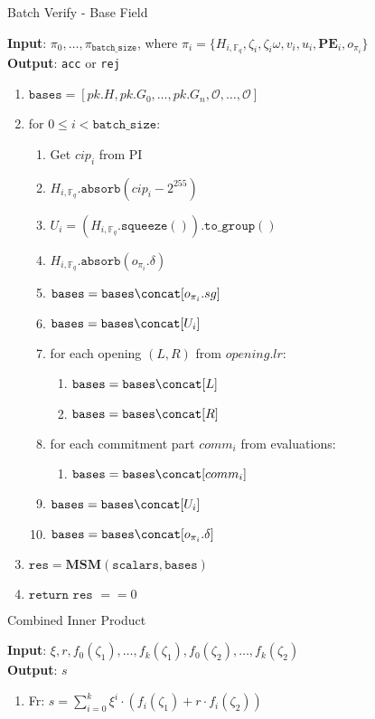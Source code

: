 \begin{algorithm}[H]
    \caption{Batch Verify - Base Field}
    \textbf{Input}: $\pi_0, \dots, \pi_{\texttt{batch\_size}}$, where $\pi_i = \{H_{i, \mathbb{F}_q}, \zeta_i, \zeta_i\omega, v_i, u_i,
    \textbf{PE}_i, o_{\pi_i} \}$ \\
    \textbf{Output}: \texttt{acc} or \texttt{rej}
    \begin{enumerate}
        \item $\texttt{bases} = [pk.H, pk.G_0, \dots, pk.G_n, \mathcal{O}, \dots, \mathcal{O}]$
        \item for $0 \leq i < \texttt{batch\_size}$:
        \begin{enumerate}
        	  \item Get $cip_i$ from PI
            \item $H_{i, \mathbb{F}_q}.\texttt{absorb}(cip_i - 2^{255})$
            \item $U_i = (H_{i, \mathbb{F}_q}.\texttt{squeeze}()).\texttt{to\_group}()$
            \item $H_{i, \mathbb{F}_q}.\texttt{absorb}(o_{\pi_i}.\delta)$
            \item $\texttt{bases} = \texttt{bases} \concat [o_{\pi_i}.sg]$
	   \item $\texttt{bases} = \texttt{bases} \concat [U_i]$
	   \item for each opening $(L, R)$ from $opening.lr$:
	   \begin{enumerate}
		\item $\texttt{bases} = \texttt{bases} \concat [L]$
		\item $\texttt{bases} = \texttt{bases} \concat [R]$
	   \end{enumerate}
	   \item for each commitment part $comm_i$ from evaluations:
            \begin{enumerate}
		\item $\texttt{bases} = \texttt{bases} \concat [comm_i]$
	   \end{enumerate}
            \item $\texttt{bases} = \texttt{bases} \concat [U_i]$
	   \item $\texttt{bases} = \texttt{bases} \concat [o_{\pi_i}.\delta]$
        \end{enumerate}
        \item $\texttt{res} = \textbf{MSM}(\texttt{scalars}, \texttt{bases})$
        \item $\texttt{return res } == 0$
    \end{enumerate}
\end{algorithm}

\begin{algorithm}[H]
    \caption{Combined Inner Product}
    \textbf{Input}: $\xi, r, f_0(\zeta_1), \dots, f_k(\zeta_1), f_0(\zeta_2), \dots, f_k(\zeta_2)$ \\ %
    \textbf{Output}: $s$
    \begin{enumerate}
        \item Fr: $s = \sum\limits_{i = 0}^{k} \xi^i \cdot (f_i(\zeta_1) + r \cdot f_i(\zeta_2))$
    \end{enumerate}
\end{algorithm}